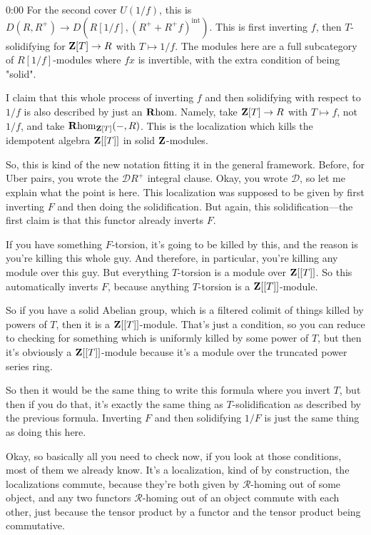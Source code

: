 \begin{unfinished}{0:00}
For the second cover $U(1/f)$, this is $D(R, R^+) \to D(R[1/f], (R^+ + R^+f)^\mathrm{int})$. This is first inverting $f$, then $T$-solidifying for $\mathbf Z[T] \to R$ with $T \mapsto 1/f$. The modules here are a full subcategory of $R[1/f]$-modules where $fx$ is invertible, with the extra condition of being "solid".

I claim that this whole process of inverting $f$ and then solidifying with respect to $1/f$ is also described by just an $\mathbf R\mathrm{hom}$. Namely, take $\mathbf Z[T] \to R$ with $T \mapsto f$, not $1/f$, and take $\mathbf R\mathrm{hom}_{\mathbf Z[T]}(-, R)$. This is the localization which kills the idempotent algebra $\mathbf Z[[T]]$ in solid $\mathbf Z$-modules.

So, this is kind of the new notation fitting it in the general framework. Before, for Uber pairs, you wrote the $\mathcal{D}R^+$ integral clause. Okay, you wrote $\mathcal{D}$, so let me explain what the point is here. This localization was supposed to be given by first inverting $F$ and then doing the solidification. But again, this solidification---the first claim is that this functor already inverts $F$. 

If you have something $F$-torsion, it's going to be killed by this, and the reason is you're killing this whole guy. And therefore, in particular, you're killing any module over this guy. But everything $T$-torsion is a module over $\mathbf Z[[T]]$. So this automatically inverts $F$, because anything $T$-torsion is a $\mathbf Z[[T]]$-module. 

So if you have a solid Abelian group, which is a filtered colimit of things killed by powers of $T$, then it is a $\mathbf Z[[T]]$-module. That's just a condition, so you can reduce to checking for something which is uniformly killed by some power of $T$, but then it's obviously a $\mathbf Z[[T]]$-module because it's a module over the truncated power series ring.

So then it would be the same thing to write this formula where you invert $T$, but then if you do that, it's exactly the same thing as $T$-solidification as described by the previous formula. Inverting $F$ and then solidifying $1/F$ is just the same thing as doing this here.

Okay, so basically all you need to check now, if you look at those conditions, most of them we already know. It's a localization, kind of by construction, the localizations commute, because they're both given by $\mathcal{R}$-homing out of some object, and any two functors $\mathcal{R}$-homing out of an object commute with each other, just because the tensor product by a functor and the tensor product being commutative.


\end{unfinished}
